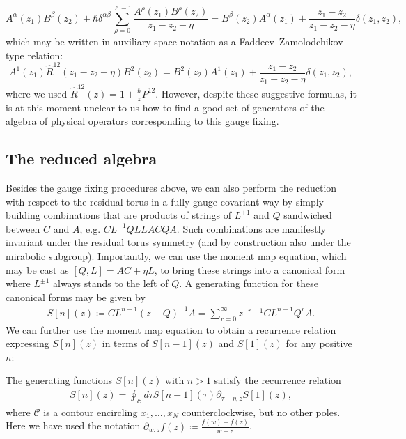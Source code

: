 \begin{equation}
A^\alpha(z_1) B^\beta(z_2) + \hbar \delta^{\alpha\beta} \sum_{\rho=0}^{\ell-1} \frac{A^\rho(z_1) B^\rho(z_2)}{z_1-z_2-\eta} = B^\beta(z_2) A^\alpha(z_1) + \frac{z_1-z_2}{z_1-z_2-\eta} \delta(z_1,z_2),
\end{equation}
which may be written in auxiliary space notation as a Faddeev--Zamolodchikov-type relation:
\begin{equation}
A^1(z_1) \hat R^{12}(z_1-z_2-\eta) B^2(z_2) = B^2(z_2) A^1(z_1) + \frac{z_1-z_2}{z_1-z_2-\eta} \delta(z_1,z_2),
\end{equation}
where we used $\hat R^{12}(z) = 1 + \frac{\hbar}{z} P^{12}$. However, despite these suggestive formulas, it is at this moment unclear to us how to find a good set of generators of the algebra of physical operators corresponding to this gauge fixing.

\subsection{The reduced algebra} \label{subsection:reducedAlgebra}

Besides the gauge fixing procedures above, we can also perform the reduction with respect to the residual torus in a fully gauge covariant way by simply building combinations that are products of strings of $L^{\pm 1}$ and $Q$ sandwiched between $C$ and $A$, e.g. $C L^{-1} Q L L A C Q A$. Such combinations are manifestly invariant under the residual torus symmetry (and by construction also under the mirabolic subgroup). Importantly, we can use the moment map equation, which may be cast as $[Q,L] = AC+\eta L$, to bring these strings into a canonical form where $L^{\pm 1}$ always stands to the left of $Q$. A generating function for these canonical forms may be given by
\begin{align}
S[n](z) \coloneq C L^{n-1} (z-Q)^{-1} A = \sum_{r=0}^\infty z^{-r-1} C L^{n-1} Q^r A.
\end{align}
We can further use the moment map equation to obtain a recurrence relation expressing $S[n](z)$ in terms of $S[n-1](z)$ and $S[1](z)$ for any positive $n$:

\begin{prop}
The generating functions $S[n](z)$ with $n > 1$ satisfy the recurrence relation
\begin{align}
S[n](z) = \oint_\mathcal{C} d\tau S[n-1](\tau) \partial_{\tau-\eta,z} S[1](z),
\end{align}
where $\mathcal{C}$ is a contour encircling $x_1,\dots,x_N$ counterclockwise, but no other poles. Here we have used the notation $\partial_{w,z} f(z) \coloneq \frac{f(w)-f(z)}{w-z}$.
\end{prop}

